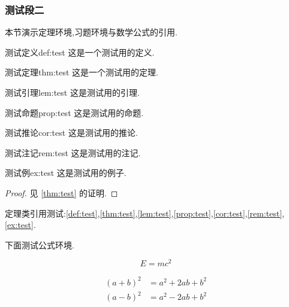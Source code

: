\subsubsection{测试段二}

本节演示定理环境,习题环境与数学公式的引用.

\begin{definition}{测试定义}{def:test}
    这是一个测试用的定义.
\end{definition}

\begin{theorem}{测试定理}{thm:test}
    这是一个测试用的定理.
\end{theorem}

\begin{lemma}{测试引理}{lem:test}
    这是测试用的引理.
\end{lemma}

\begin{proposition}{测试命题}{prop:test}
    这是测试用的命题.
\end{proposition}

\begin{corollary}{测试推论}{cor:test}
    这是测试用的推论.
\end{corollary}

\begin{remark}{测试注记}{rem:test}
    这是测试用的注记.
\end{remark}

\begin{example}{测试例}{ex:test}
    这是测试用的例子.
\end{example}

\begin{proof}
    见 \autoref{thm:test} 的证明.
\end{proof}

定理类引用测试:\autoref{def:test},\autoref{thm:test},\autoref{lem:test},\autoref{prop:test},\autoref{cor:test},\autoref{rem:test},\autoref{ex:test}.

\medskip

下面测试公式环境.

\begin{equation}\label{eq:test-1}
    E = mc^2
\end{equation}

\begin{align}
    (a+b)^2 &= a^2 + 2ab + b^2 \\
    (a-b)^2 &= a^2 - 2ab + b^2
    \label{eq:test-2}
\end{align}

